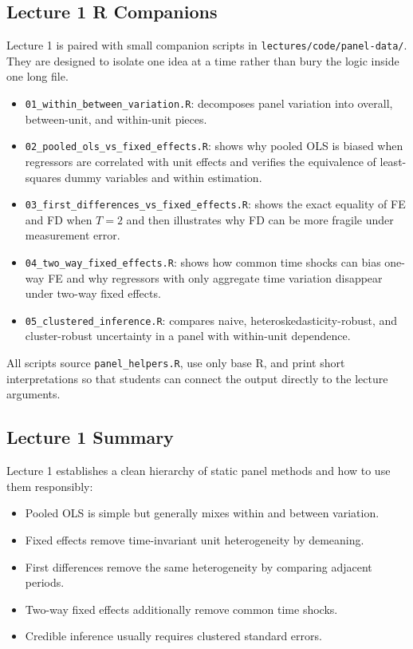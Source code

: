 \subsection{Lecture 1 R Companions}
Lecture 1 is paired with small companion scripts in \texttt{lectures/code/panel-data/}. They are designed to isolate one idea at a time rather than bury the logic inside one long file.
\begin{itemize}
\item \texttt{01\_within\_between\_variation.R}: decomposes panel variation into overall, between-unit, and within-unit pieces.
\item \texttt{02\_pooled\_ols\_vs\_fixed\_effects.R}: shows why pooled \ac{OLS} is biased when regressors are correlated with unit effects and verifies the equivalence of least-squares dummy variables and within estimation.
\item \texttt{03\_first\_differences\_vs\_fixed\_effects.R}: shows the exact equality of FE and FD when $T=2$ and then illustrates why FD can be more fragile under measurement error.
\item \texttt{04\_two\_way\_fixed\_effects.R}: shows how common time shocks can bias one-way FE and why regressors with only aggregate time variation disappear under two-way fixed effects.
\item \texttt{05\_clustered\_inference.R}: compares naive, heteroskedasticity-robust, and cluster-robust uncertainty in a panel with within-unit dependence.
\end{itemize}
All scripts source \texttt{panel\_helpers.R}, use only base \textsf{R}, and print short interpretations so that students can connect the output directly to the lecture arguments.

\subsection{Lecture 1 Summary}
Lecture 1 establishes a clean hierarchy of static panel methods and how to use them responsibly:
\begin{itemize}
\item Pooled \ac{OLS} is simple but generally mixes within and between variation.
\item Fixed effects remove time-invariant unit heterogeneity by demeaning.
\item First differences remove the same heterogeneity by comparing adjacent periods.
\item Two-way fixed effects additionally remove common time shocks.
\item Credible inference usually requires clustered standard errors.
\end{itemize}

